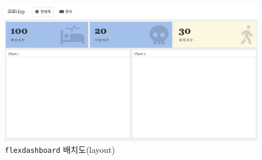 \documentclass[
  letterpaper,
]{book}
\begin{document}
\begin{figure}

{\centering \includegraphics{images/flexdashboard-layout.png}

}

\caption{\texttt{flexdashboard} 배치도(layout)}

\end{figure}
\end{document}
